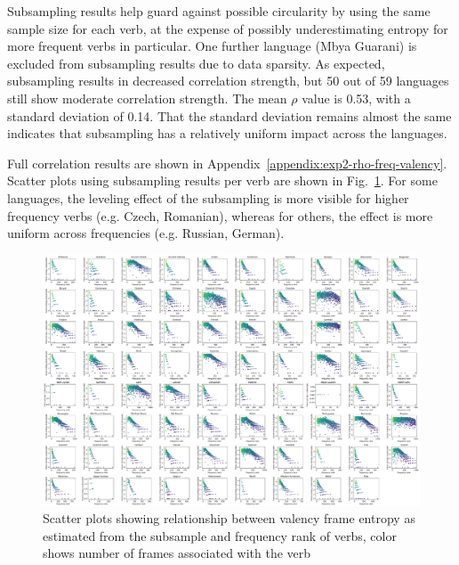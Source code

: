 Subsampling results help guard against possible circularity by using the same sample size for each verb, at the expense of possibly underestimating entropy for more frequent verbs in particular. One further language (Mbya Guarani) is excluded from subsampling results due to data sparsity. As expected, subsampling results in decreased correlation strength, but 50 out of 59 languages still show moderate correlation strength. The mean $\rho$ value is 0.53, with a standard deviation of 0.14. That the standard deviation remains almost the same indicates that subsampling has a relatively uniform impact across the languages.

Full correlation results are shown in Appendix~\ref{appendix:exp2-rho-freq-valency}. Scatter plots using subsampling results per verb are shown in Fig.~\ref{fig:joint_entropy_freq_subsample}. For some languages, the leveling effect of the subsampling is more visible for higher frequency verbs (e.g. Czech, Romanian), whereas for others, the effect is more uniform across frequencies (e.g. Russian, German).

\begin{figure}
  \centering
  \includegraphics[width=\textwidth]{figures/exp2/joint_entropy_freq_subsample.pdf}
  \caption{Scatter plots showing relationship between valency frame entropy as estimated from the subsample and frequency rank of verbs, color shows number of frames associated with the verb}
  \label{fig:joint_entropy_freq_subsample}
\end{figure}

